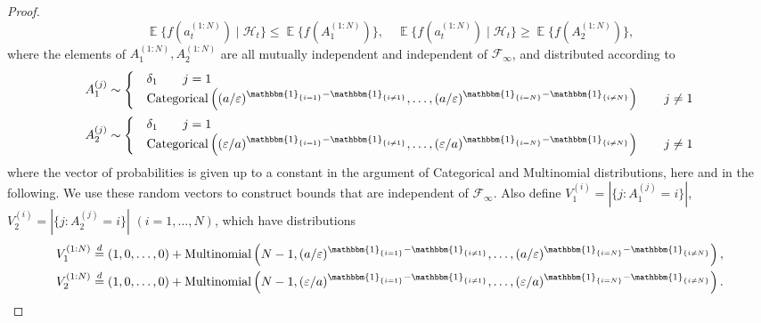\documentclass{article}
\theoremstyle{definition}
\DeclareMathOperator{\E}{\mathbb{E}}
\newcommand{\1}[1]{\mathbbm{1}_{\{#1\}}}
\begin{document}
\begin{proof}
\begin{equation}\label{eq:csmc_f_bound}
\E\{ f(a_t^{(1:N)}) \mid \mathcal{H}_t \} \leq \E\{ f(A_1^{(1:N)}) \} ,\quad
\E\{ f(a_t^{(1:N)}) \mid \mathcal{H}_t \} \geq \E\{ f(A_2^{(1:N)}) \}, 
\end{equation}
where the elements of $A_1^{(1:N)}, A_2^{(1:N)}$ are all mutually independent and independent of $\mathcal{F}_{\infty}$, and distributed according to
\begin{align*}
& A_1^{(j)} \sim \begin{cases}
& \delta_1  \qquad j=1\\
& \operatorname{Categorical}\left( (a/\varepsilon)^{\1{i=1} -\1{i\neq 1}} ,\dots, (a/\varepsilon)^{\1{i=N} -\1{i\neq N}} \right) \qquad j\neq 1
 \end{cases}\\
& A_2^{(j)} \sim \begin{cases}
& \delta_1 \qquad j=1 \\
& \operatorname{Categorical}\left( (\varepsilon/a)^{\1{i=1} -\1{i\neq 1}} ,\dots, (\varepsilon/a)^{\1{i=N} -\1{i\neq N}} \right) \qquad j\neq 1 
\end{cases}
\end{align*}
where the vector of probabilities is given up to a constant in the argument of Categorical and Multinomial distributions, here and in the following.
We use these random vectors to construct bounds that are independent of $\mathcal{F}_\infty$.
Also define $V_1^{(i)} = |\{j: A_1^{(j)}=i\}|$, $V_2^{(i)} = |\{j: A_2^{(j)}=i\}|$ $(i=1,\dots,N)$, which have distributions
\begin{align*}
& V_1^{(1:N)} \overset{d}{=} (1,0,\dots,0) + \operatorname{Multinomial}\left(N-1, (a/\varepsilon)^{\1{i=1} -\1{i\neq 1}} ,\dots, (a/\varepsilon)^{\1{i=N} -\1{i\neq N}} \right) , \\
& V_2^{(1:N)} \overset{d}{=} (1,0,\dots, 0) + \operatorname{Multinomial}\left(N-1, (\varepsilon/a)^{\1{i=1} -\1{i\neq 1}} ,\dots, (\varepsilon/a)^{\1{i=N} -\1{i\neq N}} \right) .
\end{align*}


\end{proof}
\end{document}
